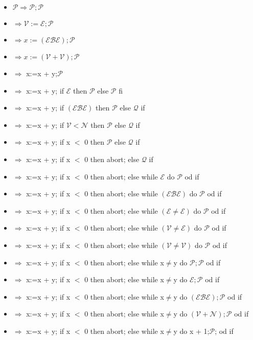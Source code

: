 \begin{itemize}
\item $\mathcal{P}\Rightarrow \mathcal{P};\mathcal{P}$

\item $\Rightarrow \mathcal{V}:=\mathcal{E};\mathcal{P}$
\item $\Rightarrow x:=(\mathcal{E} \mathcal{B} \mathcal{E});\mathcal{P}$
\item $\Rightarrow x:=(\mathcal{V} + \mathcal{V});\mathcal{P}$
\item $\Rightarrow$ x:=x + y;$\mathcal{P	}$
\item $\Rightarrow$ x:=x + y; if $\mathcal{E}$ then $\mathcal{P}$ else $ \mathcal{P}$ fi
\item $\Rightarrow$ x:=x + y; if $(\mathcal{E} \mathcal{B} \mathcal{E})$ then $\mathcal{P}$ else $ \mathcal{Q}$ if
\item $\Rightarrow$ x:=x + y; if $\mathcal{V} < \mathcal{N}$ then $\mathcal{P}$ else $ \mathcal{Q}$ if
\item $\Rightarrow$ x:=x + y; if x $<$ 0 then $\mathcal{P}$ else $ \mathcal{Q}$ if
\item $\Rightarrow$ x:=x + y; if x $< $ 0 then abort; else $ \mathcal{Q}$ if
\item $\Rightarrow$ x:=x + y; if x $< $ 0 then abort; else while $\mathcal{E}$ do $ \mathcal{P}$ od if
\item $\Rightarrow$ x:=x + y; if x $ < $ 0 then abort; else while $(\mathcal{E} \mathcal{B} \mathcal{E})$ do $ \mathcal{P}$ od if
\item $\Rightarrow$ x:=x + y; if x $<$ 0 then abort; else while $(\mathcal{E} \neq \mathcal{E})$ do $ \mathcal{P}$ od if
\item $\Rightarrow$ x:=x + y; if x $<$ 0 then abort; else while $(\mathcal{V} \neq \mathcal{E})$ do $ \mathcal{P}$ od if
\item $\Rightarrow$ x:=x + y; if x $ < $ 0 then abort; else while $(\mathcal{V} \neq \mathcal{V})$ do $ \mathcal{P}$ od if
\item $\Rightarrow$ x:=x + y; if x $<$ 0 then abort; else while x$ \neq $y do $ \mathcal{P};\mathcal{P}$ od if

\item $\Rightarrow$ x:=x + y; if x $ <$ 0 then abort; else while x$ \neq $y do $ \mathcal{E};\mathcal{P}$ od if
\item $\Rightarrow$ x:=x + y; if x $<$ 0 then abort; else while x$ \neq $y do $ (\mathcal{E} \mathcal{B} \mathcal{E});\mathcal{P}$ od if
\item $\Rightarrow$ x:=x + y; if x $<$ 0 then abort; else while x$ \neq $y do $ (\mathcal{V} + \mathcal{N});\mathcal{P}$ od if
\item $\Rightarrow$ x:=x + y; if x $<$ 0 then abort; else while x$ \neq $y do x + 1;$\mathcal{P}$; od if


\end{itemize}
